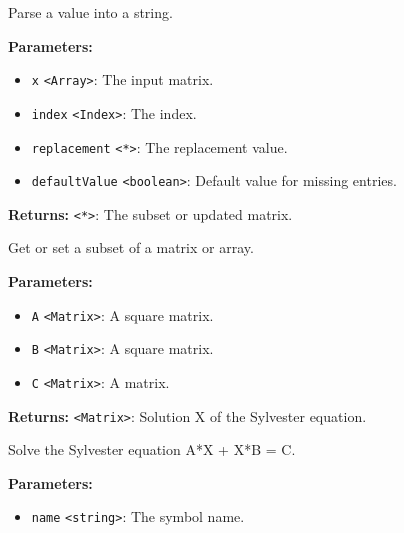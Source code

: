 \documentclass[12pt,a4paper]{article}
\begin{document}
\noindent Parse a value into a string.

\vspace{5mm}
\noindent {}


\noindent \textbf{Parameters:}
\begin{itemize}
  \item \texttt{x} \texttt{<Array>}: The input matrix.
  \item \texttt{index} \texttt{<Index>}: The index.
  \item \texttt{replacement} \texttt{<*>}: The replacement value.
  \item \texttt{defaultValue} \texttt{<boolean>}: Default value for missing entries.
\end{itemize}

\noindent \textbf{Returns:} \texttt{<*>}: The subset or updated matrix.

\noindent Get or set a subset of a matrix or array.

\vspace{5mm}
\noindent {}


\noindent \textbf{Parameters:}
\begin{itemize}
  \item \texttt{A} \texttt{<Matrix>}: A square matrix.
  \item \texttt{B} \texttt{<Matrix>}: A square matrix.
  \item \texttt{C} \texttt{<Matrix>}: A matrix.
\end{itemize}

\noindent \textbf{Returns:} \texttt{<Matrix>}: Solution X of the Sylvester equation.

\noindent Solve the Sylvester equation A*X + X*B = C.

\vspace{5mm}
\noindent {}


\noindent \textbf{Parameters:}
\begin{itemize}
  \item \texttt{name} \texttt{<string>}: The symbol name.
\end{itemize}
\end{document}
